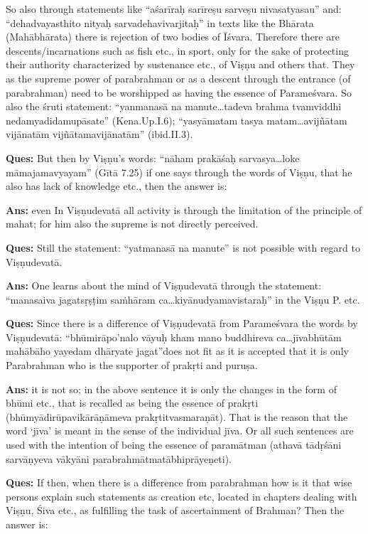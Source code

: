 So also through statements like “aśarīraḥ sarīreṣu sarveṣu nivasatyasau” and: “dehadvaya\-sthito nityaḥ sarvadehavivarjitaḥ” in texts like the Bhārata (Mahābhārata) there is rejection of two bodies of Īśvara.  Therefore there are descents/\-incarnations such as fish etc., in sport, only for the sake of protecting their authority characterized by sustenance etc., of Viṣṇu and others that. They as the supreme power of parabrahman or as a descent through the entrance (of parabrahman) need to be worshipped as having the essence of Parameśvara. So also the śruti statement: “yanmanasā na manute…tadeva brahma tvamviddhi nedam\break yadidamu\-pā\-sate” (Kena.Up.I.6); “yasyāmatam tasya matam…avijñātam vijānatām vijñātamavijānatām” (ibid.II.3).

\textbf{Ques:} But then by Viṣṇu’s words: “nāham prakāśaḥ sarvasya…loke māmajamavyayam” (Gītā 7.25) if one says through the words of Viṣṇu, that he also has lack of knowledge etc., then the answer is: 

\textbf{Ans:} even In Viṣṇudevatā all activity is through the limitation of the principle of mahat; for him also the supreme is not directly perceived.  

\textbf{Ques:} Still the statement: “yatmanasā na manute” is not possible with regard to Viṣṇudevatā. 

\textbf{Ans:} One learns about the mind of Viṣṇudevatā through the statement: “manasaiva jagatsṛṣṭim saṁhāram ca…kiyānudyamavistaraḥ” in the Viṣṇu P. etc. 

\vskip 2pt

\textbf{Ques:} Since there is a difference of Viṣṇudevatā from Parameśvara the words by Viṣṇudevatā: “bhūmirāpo’nalo vāyuḥ kham mano buddhireva ca…jīvabhūtām mahābāho yayedam dhāryate jagat”does not fit as it is accepted that it is only Parabrahman who is the supporter of prakṛti and puruṣa.

\vskip 2pt

\textbf{Ans:} it is not so; in the above sentence it is only the changes in the form of bhūmi etc., that is recalled as being the essence of prakṛti (bhūmyādirūpavikārāṇāmeva prakṛtitvasmaraṇāt). That is the reason that the word ‘jīva’ is meant in the sense of the individual jīva. Or all such sentences are used with the intention of being the essence of paramātman (athavā tādṛśāni sarvāṇyeva vākyāni parabrahmātmatābhiprāyeṇeti).

\vskip 2pt

\textbf{Ques:} If then, when there is a difference from parabrahman how is it that  wise persons explain such statements as creation etc, located in chapters dealing with Viṣṇu, Śiva etc., as fulfilling the task of ascertainment of Brahman? Then the answer is:


